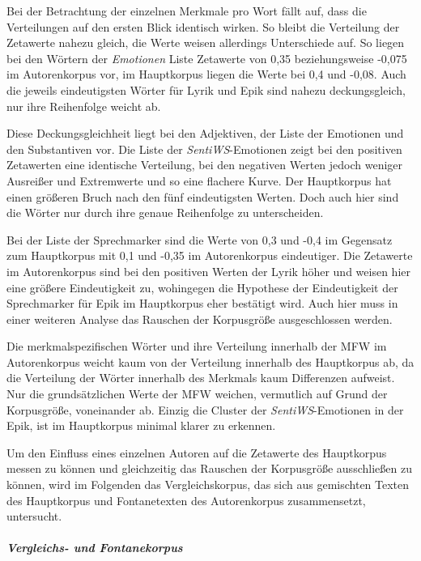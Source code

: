\documentclass[a4paper,10p]{article}
\begin{document}
Bei der Betrachtung der einzelnen Merkmale pro Wort fällt auf, dass die Verteilungen auf den ersten Blick identisch wirken. So bleibt die Verteilung der Zetawerte nahezu gleich, die Werte weisen allerdings Unterschiede auf. So liegen bei den Wörtern der \emph{Emotionen} Liste Zetawerte von 0,35 beziehungsweise -0,075 im Autorenkorpus vor, im Hauptkorpus liegen die Werte bei 0,4 und -0,08. Auch die jeweils eindeutigsten Wörter für Lyrik und Epik sind nahezu deckungsgleich, nur ihre Reihenfolge weicht ab. \par 

Diese Deckungsgleichheit liegt bei den Adjektiven, der Liste der Emotionen und den Substantiven  vor. Die Liste der \emph{SentiWS}-Emotionen zeigt bei den positiven Zetawerten eine identische Verteilung,  bei den negativen Werten jedoch weniger Ausreißer und Extremwerte und so eine flachere Kurve. Der Hauptkorpus hat einen größeren Bruch nach den fünf eindeutigsten Werten. Doch auch hier sind die Wörter nur durch ihre genaue Reihenfolge zu unterscheiden.  \par 

Bei der Liste der Sprechmarker sind die Werte von 0,3 und -0,4 im Gegensatz zum Hauptkorpus mit 0,1 und -0,35 im Autorenkorpus eindeutiger. Die Zetawerte im Autorenkorpus sind bei den positiven Werten der Lyrik höher und weisen hier eine größere Eindeutigkeit zu, wohingegen die Hypothese der Eindeutigkeit der Sprechmarker für Epik im Hauptkorpus eher bestätigt wird. Auch hier muss in einer weiteren Analyse das Rauschen der Korpusgröße ausgeschlossen werden. \par 

Die merkmalspezifischen Wörter und ihre Verteilung innerhalb der MFW im Autorenkorpus weicht kaum von der Verteilung innerhalb des Hauptkorpus ab, da die Verteilung der Wörter innerhalb des Merkmals kaum Differenzen aufweist. Nur die grundsätzlichen Werte der MFW weichen, vermutlich auf Grund der Korpusgröße, voneinander ab. Einzig die Cluster der \emph{SentiWS}-Emotionen in der Epik, ist im Hauptkorpus minimal klarer zu erkennen. \par 

Um den Einfluss eines einzelnen Autoren auf die Zetawerte des Hauptkorpus messen zu können und gleichzeitig das Rauschen der Korpusgröße ausschließen zu können, wird im Folgenden das Vergleichskorpus, das sich aus gemischten Texten des Hauptkorpus und Fontanetexten des Autorenkorpus zusammensetzt, untersucht. 

\subparagraph{Vergleichs- und Fontanekorpus} \quad \par 
\end{document}
